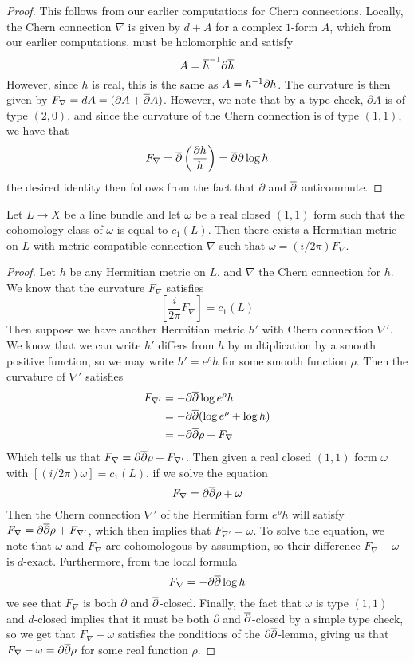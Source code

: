 %
\begin{proof}
This follows from our earlier computations for Chern connections. Locally, the Chern
connection $\nabla$ is given by $d + A$ for a complex $1$-form $A$, which
from our earlier computations, must be holomorphic and satisfy
\[
A = \overline{h}^{-1} \partial \overline{h}
\]
However, since $h$ is real, this is the same as $A = h^{-1}\partial h$.
The curvature is then given by $F_\nabla = dA = (\partial A + \overline{\partial} A)$. However,
we note that by a type check, $\partial A$ is of type $(2,0)$, and since the curvature
of the Chern connection is of type $(1,1)$, we have that
\[
F_\nabla = \overline{\partial}\left(\frac{\partial h}{h}\right) = \overline{\partial}\partial\log h
\]
the desired identity then follows from the fact that $\partial$ and $\overline{\partial}$ anticommute.
\end{proof}
%
\begin{prop}
Let $L \to X$ be a line bundle and let $\omega$ be a real closed $(1,1)$ form such
that the cohomology class of $\omega$ is equal to $c_1(L)$. Then there exists a
Hermitian metric on $L$ with metric compatible connection $\nabla$ such that
$\omega = (i/2\pi)F_\nabla$.
\end{prop}
%
\begin{proof}
Let $h$ be any Hermitian metric on $L$, and $\nabla$ the Chern connection for $h$.
We know that the curvature $F_\nabla$ satisfies
\[
\left[\frac{i}{2\pi}F_\nabla\right] = c_1(L)
\]
Then suppose we have another Hermitian metric $h'$ with Chern connection $\nabla'$.
We know that we can write $h'$ differs from $h$ by multiplication by a smooth positive
function, so we may write $h' = e^\rho h$ for some smooth function $\rho$. Then the
curvature of $\nabla'$ satisfies
\begin{align*}
F_{\nabla'} &= -\partial\overline{\partial}\log e^\rho h \\
&= -\partial\overline{\partial}(\log e^\rho + \log h) \\
&= -\partial\overline{\partial}\rho + F_\nabla
\end{align*}
Which tells us that $F_\nabla = \partial\overline{\partial}\rho + F_{\nabla'}$.
Then given a real closed $(1,1)$ form $\omega$ with $[(i/2\pi)\omega] = c_1(L)$,
if we solve the equation
\[
F_\nabla = \partial\overline{\partial}\rho + \omega
\]
Then the Chern connection $\nabla'$ of the Hermitian form $e^\rho h$ will satisfy
$F_{\nabla} = \partial\overline{\partial}\rho + F_{\nabla'}$, which then implies that
$F_{\nabla'} = \omega$. To solve the equation, we note that $\omega$ and
$F_\nabla$ are cohomologous by assumption, so their difference $F_\nabla - \omega$
is $d$-exact. Furthermore, from the local formula
\[
F_\nabla = -\partial\overline{\partial}\log h
\]
we see that $F_\nabla$ is both $\partial$ and $\overline{\partial}$-closed. Finally, the
fact that $\omega$ is type $(1,1)$ and $d$-closed implies that it must be both
$\partial$ and $\overline{\partial}$-closed by a simple type check, so we get that
$F_\nabla - \omega$ satisfies the conditions of the $\partial\overline{\partial}$-lemma,
giving us that $F_\nabla - \omega = \partial\overline{\partial}\rho$ for some real function
$\rho$.
\end{proof}
